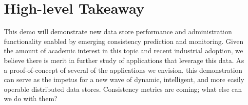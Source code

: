 \section{High-level Takeaway}

This demo will demonstrate new data store performance and
administration functionality enabled by emerging consistency
prediction and monitoring. Given the amount of academic interest in
this topic and recent industrial adoption, we believe there is merit
in further study of applications that leverage this data. As a
proof-of-concept of several of the applications we envision, this
demonstration can serve as the impetus for a new wave of dynamic,
intelligent, and more easily operable distributed data stores. Consistency metrics
are coming; what else can we do with them?
